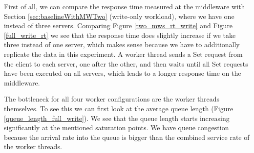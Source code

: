 First of all, we can compare the response time measured at the middleware with Section \ref{sec:baselineWithMWTwo} (write-only workload), where we have one instead of three servers. Comparing Figure \ref{two_mws_rt_write} and Figure \ref{full_write_rt} we see that the response time does slightly increase if we take three instead of one server, which makes sense because we have to additionally replicate the data in this experiment. A worker thread sends a Set request from the client to each server, one after the other, and then waits until all Set requests have been executed on all servers, which leads to a longer response time on the middleware. 

The bottleneck for all four worker configurations are the worker threads themselves. To see this we can first look at the average queue length (Figure \ref{queue_length_full_write}). We see that the queue length starts increasing significantly at the mentioned saturation points. We have queue congestion because the arrival rate into the queue is bigger than the combined service rate of the worker threads. 

